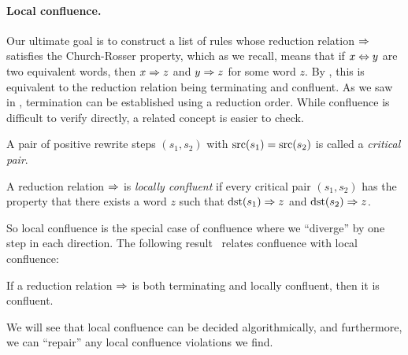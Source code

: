 \documentclass[../generics]{subfiles}
\begin{document}
\paragraph{Local confluence.}
Our ultimate goal is to construct a list of rules whose reduction relation $\Rightarrow$ satisfies the Church-Rosser property, which as we recall, means that if $x\Leftrightarrow y$ are two equivalent words, then $x\Rightarrow z$ and $y\Rightarrow z$ for some word $z$. By , this is equivalent to the reduction relation being terminating and confluent. As we saw in , termination can be established using a reduction order. While confluence is difficult to verify directly, a related concept is easier to check.
\begin{definition}
A pair of positive rewrite steps $(s_1, s_2)$ with $\operatorname{src}(s_1)=\operatorname{src}(s_2)$ is called a \emph{critical pair}.
\end{definition}
\begin{definition}
A reduction relation $\Rightarrow$ is \emph{locally confluent} if every critical pair $(s_1, s_2)$ has the property that there exists a word $z$ such that $\operatorname{dst}(s_1)\Rightarrow z$ and $\operatorname{dst}(s_2)\Rightarrow z$.
\end{definition}
So local confluence is the special case of confluence where we ``diverge'' by one step in each direction. The following result~\cite{newman} relates confluence with local confluence:
\begin{theorem}
If a reduction relation $\Rightarrow$ is both terminating and locally confluent, then it is confluent.
\end{theorem}

We will see that local confluence can be decided algorithmically, and furthermore, we can ``repair'' any local confluence violations we find.
\end{document}
